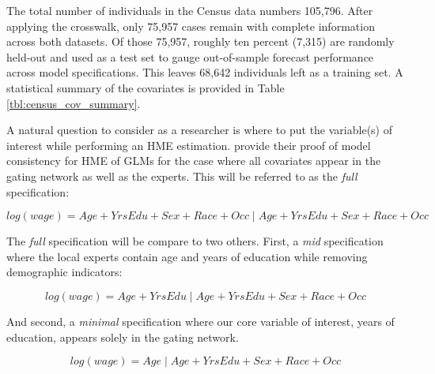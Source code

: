 \documentclass[12pt]{article}
\begin{document}
The total number of individuals in the Census data numbers 105,796.
After applying the crosswalk, only 75,957 cases remain with complete
information across both datasets. Of those 75,957, roughly ten percent
(7,315) are randomly held-out and used as a test set to gauge
out-of-sample forecast performance across model specifications.
This leaves 68,642 individuals left as a training set. A statistical summary
of the covariates is provided in Table \ref{tbl:census_cov_summary}.

\bigskip

A natural question to consider as a researcher is where to put the variable(s)
of interest while performing an HME estimation. \citet{JiangTanner2000}
provide their proof of model consistency for HME of GLMs for the case where
all covariates appear in the gating network as well as the experts. This will
be referred to as the \textit{full} specification:

\begin{equation} \label{eq:full_formula}
  log(wage) = Age + YrsEdu + Sex +  Race + Occ \; | \; Age + YrsEdu + Sex +  Race + Occ
\end{equation}

The \textit{full} specification will be compare to two others.
First, a \textit{mid} specification where the local experts contain age and
years of education while removing demographic indicators:

\begin{equation} \label{eq:mid_formula}
  log(wage) = Age + YrsEdu \; | \; Age + YrsEdu + Sex +  Race + Occ
\end{equation}

And second, a \textit{minimal} specification where our core variable
of interest, years of education, appears solely in the gating network.

\begin{equation} \label{eq:min_formula}
  log(wage) = Age \; | \; Age + YrsEdu + Sex +  Race + Occ
\end{equation}
\end{document}
